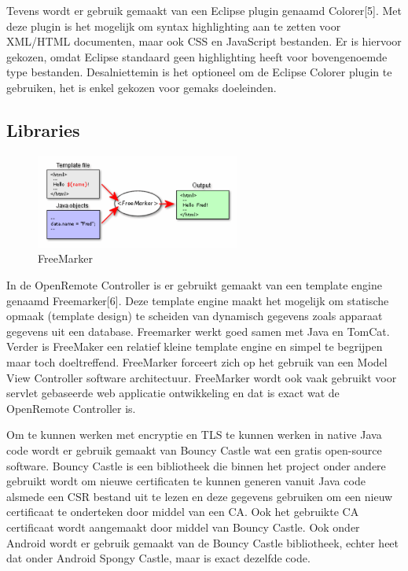 \documentclass[]{article}
\begin{document}
Tevens wordt er gebruik gemaakt van een Eclipse plugin genaamd Colorer[5].
Met deze plugin is het mogelijk om syntax highlighting aan te zetten voor
XML/HTML documenten, maar ook CSS en JavaScript bestanden. Er is hiervoor
gekozen, omdat Eclipse standaard geen highlighting heeft voor bovengenoemde
type bestanden. Desalniettemin is het optioneel om de Eclipse Colorer
plugin te gebruiken, het is enkel gekozen voor gemaks doeleinden.

\subsection{Libraries}
\begin{figure}[htpb]
   \begin{center}
     \includegraphics[width=0.6\textwidth]{freemarker.pdf}
   \end{center}
   \caption{FreeMarker}
\end{figure}

In de OpenRemote Controller is er gebruikt gemaakt van een template engine
genaamd Freemarker[6]. Deze template engine maakt het mogelijk om statische
opmaak (template design) te scheiden van dynamisch gegevens zoals apparaat
gegevens uit een database. Freemarker werkt goed samen met Java en TomCat.
Verder is FreeMaker een relatief kleine template engine en simpel te
begrijpen maar toch doeltreffend. FreeMarker forceert zich op het gebruik
van een Model View Controller software architectuur. FreeMarker wordt ook
vaak gebruikt voor servlet gebaseerde web applicatie ontwikkeling en dat is
exact wat de OpenRemote Controller is.

Om te kunnen werken met encryptie en TLS te kunnen werken in native Java code
wordt er gebruik gemaakt van Bouncy Castle wat een gratis open-source software.
Bouncy Castle is een bibliotheek die binnen het project onder andere gebruikt
wordt om nieuwe certificaten te kunnen generen vanuit Java code alsmede een CSR
bestand uit te lezen en deze gegevens gebruiken om een nieuw certificaat te
onderteken door middel van een CA. Ook het gebruikte CA certificaat wordt
aangemaakt door middel van Bouncy Castle. Ook onder Android wordt er gebruik
gemaakt van de Bouncy Castle bibliotheek, echter heet dat onder Android Spongy
Castle, maar is exact dezelfde code.
\end{document}
